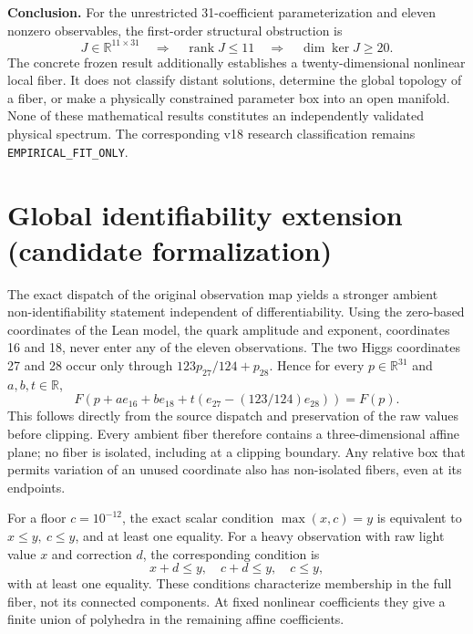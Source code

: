 \documentclass[11pt]{article}
\newcommand{\R}{\mathbb{R}}
\newcommand{\rank}{\operatorname{rank}}
\newcommand{\Null}{\operatorname{ker}}
\begin{document}
\noindent\textbf{Conclusion.}
For the unrestricted 31-coefficient parameterization and eleven
nonzero observables, the first-order structural obstruction is
\begin{equation}
 \boxed{
  J\in\R^{11\times31}
  \quad\Longrightarrow\quad
  \rank J\leq11
  \quad\Longrightarrow\quad
  \dim\Null J\geq20.
 }
\end{equation}
The concrete frozen result additionally establishes a twenty-dimensional
nonlinear local fiber. It does not classify distant solutions, determine
the global topology of a fiber, or make a physically constrained parameter
box into an open manifold. None of these mathematical results constitutes
an independently validated physical spectrum. The corresponding v18 research
classification remains \texttt{EMPIRICAL\_FIT\_ONLY}.

\section{Global identifiability extension (candidate formalization)}

The exact dispatch of the original observation map yields a stronger
ambient non-identifiability statement independent of differentiability.
Using the zero-based coordinates of the Lean model, the quark amplitude
and exponent, coordinates 16 and 18, never enter any of the eleven
observations. The two Higgs coordinates 27 and 28 occur only through
\(123p_{27}/124+p_{28}\). Hence for every \(p\in\R^{31}\) and
\(a,b,t\in\R\),
\[
 F(p+a e_{16}+b e_{18}+t(e_{27}-(123/124)e_{28}))=F(p).
\]
This follows directly from the source dispatch and preservation of
the raw values before clipping. Every ambient fiber therefore contains
a three-dimensional affine plane; no fiber is isolated, including at
a clipping boundary. Any relative box that permits variation of an
unused coordinate also has non-isolated fibers, even at its endpoints.

For a floor \(c=10^{-12}\), the exact scalar condition
\(\max(x,c)=y\) is equivalent to \(x\le y,\ c\le y\), and at least
one equality. For a heavy observation with raw light value \(x\)
and correction \(d\), the corresponding condition is
\[
 x+d\le y,\quad c+d\le y,\quad c\le y,
\]
with at least one equality. These conditions characterize membership
in the full fiber, not its connected components. At fixed nonlinear
coefficients they give a finite union of polyhedra in the remaining
affine coefficients.
\end{document}
